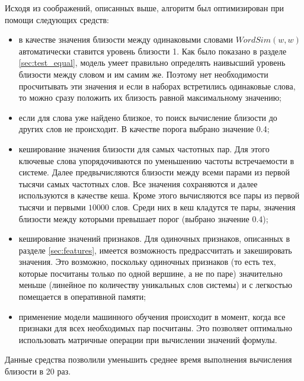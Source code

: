 Исходя из соображений, описанных выше, алгоритм был оптимизирован при помощи следующих средств:
\begin{itemize}
    \item в качестве значения близости между одинаковыми словами $WordSim(w, w)$ автоматически ставится уровень близости 1. Как было показано в разделе \ref{sec:test_equal}, модель умеет правильно определять наивысший уровень близости между словом и им самим же. Поэтому нет необходимости просчитывать эти значения и если в наборах встретились одинаковые слова, то можно сразу положить их близость равной максимальному значению;
    \item если для слова уже найдено близкое, то поиск вычисление близости до других слов не происходит. В качестве порога выбрано значение 0.4;
    \item кеширование значения близости для самых частотных пар. Для этого ключевые слова упорядочиваются по уменьшению частоты встречаемости в системе. Далее предвычисляются близости между всеми парами из первой тысячи самых частотных слов. Все значения сохраняются и далее используются в качестве кеша. Кроме этого вычисляются все пары из первой тысячи и первыми $10000$ слов. Среди них в кеш кладутся те пары, значения близости между которыми превышает порог (выбрано значение 0.4);
    \item кеширование значений признаков. Для одиночных признаков, описанных в разделе \ref{sec:features}, имеется возможность предрассчитать и закешировать значения. Это возможно, поскольку одиночных признаков (то есть тех, которые посчитаны только по одной вершине, а не по паре) значительно меньше (линейное по количеству уникальных слов системы) и с легкостью помещается в оперативной памяти;
    \item применение модели машинного обучения происходит в момент, когда все признаки для всех необходимых пар посчитаны. Это позволяет оптимально использовать матричные операции при вычислении значений формулы.
\end{itemize}

Данные средства позволили уменьшить среднее время выполнения вычисления близости в 20 раз.

